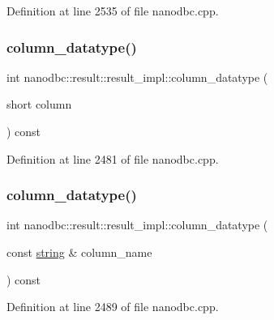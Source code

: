 Definition at line 2535 of file nanodbc.\+cpp.

\mbox{\label{classnanodbc_1_1result_1_1result__impl_ae616af3169e4c04a47e873da394ce05a}} 
\subsubsection{\texorpdfstring{column\_datatype()}{column\_datatype()}\hspace{0.1cm}{\footnotesize\ttfamily [1/2]}}
{\footnotesize\ttfamily int nanodbc\+::result\+::result\+\_\+impl\+::column\+\_\+datatype (\begin{DoxyParamCaption}\item[{short}]{column }\end{DoxyParamCaption}) const\hspace{0.3cm}{\ttfamily [inline]}}



Definition at line 2481 of file nanodbc.\+cpp.

\mbox{\label{classnanodbc_1_1result_1_1result__impl_aadb704083b0ab05d2b481dee905c2efc}} 
\subsubsection{\texorpdfstring{column\_datatype()}{column\_datatype()}\hspace{0.1cm}{\footnotesize\ttfamily [2/2]}}
{\footnotesize\ttfamily int nanodbc\+::result\+::result\+\_\+impl\+::column\+\_\+datatype (\begin{DoxyParamCaption}\item[{const \mbox{\hyperlink{namespacenanodbc_abfc0ece56278e590911ec8352774c212}{string}} \&}]{column\+\_\+name }\end{DoxyParamCaption}) const\hspace{0.3cm}{\ttfamily [inline]}}



Definition at line 2489 of file nanodbc.\+cpp.

